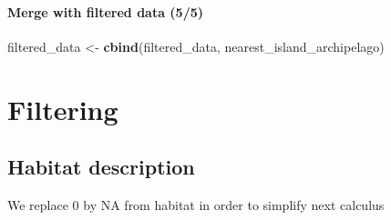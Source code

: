 \documentclass[
]{article}
\newenvironment{Shaded}{\begin{snugshade}}{\end{snugshade}}
\newcommand{\FunctionTok}[1]{\textcolor[rgb]{0.13,0.29,0.53}{\textbf{#1}}}
\newcommand{\NormalTok}[1]{#1}
\newcommand{\OtherTok}[1]{\textcolor[rgb]{0.56,0.35,0.01}{#1}}
\begin{document}
\hypertarget{merge-with-filtered-data-55}{%
\paragraph{Merge with filtered data
(5/5)}\label{merge-with-filtered-data-55}}

\begin{Shaded}
\begin{Highlighting}[]
\NormalTok{filtered\_data }\OtherTok{\textless{}{-}} \FunctionTok{cbind}\NormalTok{(filtered\_data, nearest\_island\_archipelago)}
\end{Highlighting}
\end{Shaded}

\hypertarget{filtering}{%
\section{Filtering}\label{filtering}}

\hypertarget{habitat-description}{%
\subsection{Habitat description}\label{habitat-description}}

We replace 0 by NA from habitat in order to simplify next calculus
\end{document}
